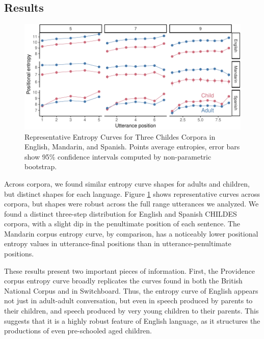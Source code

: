 \documentclass[10pt, letterpaper]{article}
\newenvironment{CodeChunk}{}{}
\begin{document}
\hypertarget{results-1}{%
\subsection{Results}\label{results-1}}

\begin{CodeChunk}
\begin{figure}[tb]

{\centering \includegraphics{figs/plot_childes-1} 

}

\caption[Representative Entropy Curves for Three Childes Corpora in English, Mandarin, and Spanish]{Representative Entropy Curves for Three Childes Corpora in English, Mandarin, and Spanish. Points average entropies, error bars show 95\% confidence intervals computed by non-parametric bootstrap.}\label{fig:plot_childes}
\end{figure}
\end{CodeChunk}

Across corpora, we found similar entropy curve shapes for adults and
children, but distinct shapes for each language. Figure
\ref{fig:plot_childes} shows representative curves across corpora, but
shapes were robust across the full range utterances we analyzed. We
found a distinct three-step distribution for English and Spanish CHILDES
corpora, with a slight dip in the penultimate position of each sentence.
The Mandarin corpus entropy curve, by comparison, has a noticeably lower
positional entropy values in utterance-final positions than in
utterance-penultimate positions.

These results present two important pieces of information. First, the
Providence corpus entropy curve broadly replicates the curves found in
both the British National Corpus and in Switchboard. Thus, the entropy
curve of English appears not just in adult-adult conversation, but even
in speech produced by parents to their children, and speech produced by
very young children to their parents. This suggests that it is a highly
robust feature of English language, as it structures the productions of
even pre-schooled aged children.
\end{document}
